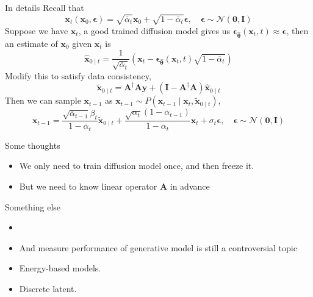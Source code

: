 \documentclass[10pt,xcolor={usenames,dvipsnames,table},aspectratio=169]{beamer}
\begin{document}
\begin{frame}{In details}
    Recall that
    \[
        \bm{x}_t(\bm{x}_0, \boldsymbol \epsilon) = \sqrt{\overline{\alpha}_t} \bm{x}_0 + \sqrt{1- \overline{\alpha}_t} \boldsymbol \epsilon, \quad \boldsymbol \epsilon \sim \mathcal{N}(\bm{0}, \bm{I})
    \] 
    Suppose we have $\bm{x}_t$,
    a good trained diffusion model gives us 
    $\boldsymbol \epsilon_{\widehat{\boldsymbol \theta}}(\bm{x}_t, t) \approx \boldsymbol \epsilon$, then an estimate of $\bm{x}_0$ given $\bm{x}_t$ is
    \[
\widehat{\bm{x}}_{0 \mid t} = \dfrac{1}{\sqrt{\overline{\alpha}_t}} \left( \bm{x}_t - \boldsymbol \epsilon_{\widehat{\boldsymbol \theta}}(\bm{x}_t, t) \sqrt{1-\overline{\alpha}_t} \right)
    \] 
    Modify this to satisfy data consistency,
    \[
    \widetilde{\bm{x}}_{0\mid t} = \bm{A}^{\dagger} \bm{A} \bm{y} + (\bm{I} - \bm{A}^{\dagger} \bm{A}) \widehat{\bm{x}}_{0\mid t}
    \] 
    Then we can sample $\bm{x}_{t-1}$ as $\bm{x}_{t-1} \sim P(\bm{x}_{t-1} \mid \bm{x}_{t}, \widetilde{\bm{x}}_{0 \mid t})$,
    \[
    \bm{x}_{t-1} = \dfrac{\sqrt{\overline{\alpha}_{t-1}} \beta_t}{1-\overline{\alpha}_t} \widetilde{\bm{x}}_{0\mid t} + \dfrac{\sqrt{\alpha_t}(1- \overline{\alpha}_{t-1})}{1-\alpha_t}\bm{x}_t + \sigma_t \boldsymbol \epsilon  , \quad \boldsymbol \epsilon \sim \mathcal{N}(\bm{0}, \bm{I})
    \] 
\end{frame}
\begin{frame}
    Some thoughts
    \begin{itemize}
        \item We only need to train diffusion model once, and then freeze it.
        \item But we need to know linear operator $\bm{A}$ in advance
    \end{itemize}
\end{frame}

%

\begin{frame}{Something else}
    \begin{itemize}
        \item {}
        \item And measure performance of generative model is still a controversial topic
        \item Energy-based models.
        \item Discrete latent.
    \end{itemize}
\end{frame}
\end{document}
